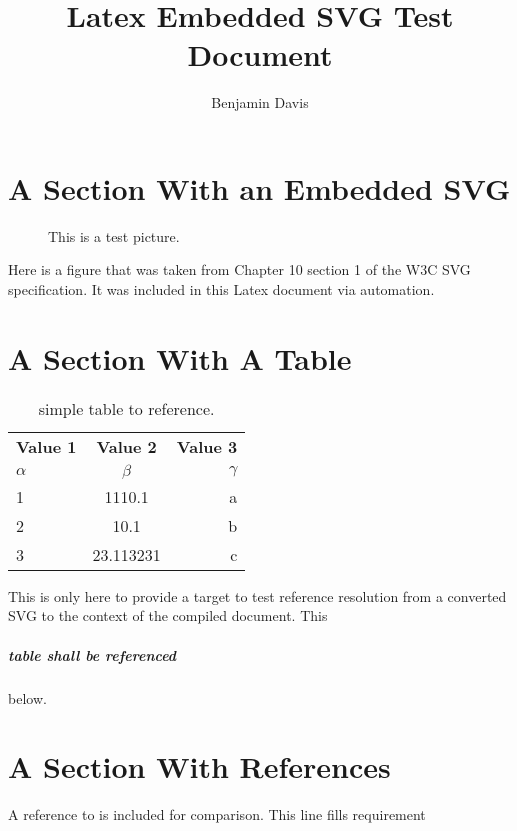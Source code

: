 \documentclass{article}
\title{Latex Embedded SVG Test Document}
\author{Benjamin Davis}
\date{}
\begin{document}
\maketitle

\section{A Section With an Embedded SVG}
\begin{figure}
  \caption{This is a test picture.}
  \label{fig:TestPicture}
  \centering
  \scalebox{0.25}{}
\end{figure}
Here is a figure that was taken from Chapter 10 section 1 of the W3C SVG
specification. It was included in this Latex document via automation.

\section{A Section With A Table}
\begin{table}[h!]
  \begin{center}
    \caption{simple table to reference.}
    \label{tab:ExampleTable}
    \begin{tabular}{l|c|r} %
      \textbf{Value 1} & \textbf{Value 2} & \textbf{Value 3}\\
      $\alpha$ & $\beta$ & $\gamma$ \\
      \hline
      1 & 1110.1 & a\\
      2 & 10.1 & b\\
      3 & 23.113231 & c\\
    \end{tabular}
  \end{center}
\end{table}

This is only here to provide a target to test reference resolution from a
converted SVG to the context of the compiled document.
This \subparagraph{table shall  be referenced}\label{shl:ReferenceTabel} below.

\section{A Section With References}

A reference to  is included for comparison. This
line fills requirement 

\begin{figure}
\centering

\end{figure}
\end{document}

